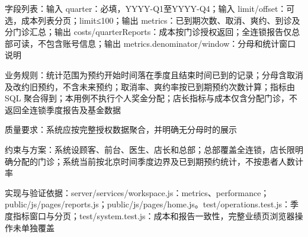 \documentclass[UTF8,12pt,a4paper,fontset=none]{ctexart}
\begin{document}
字段列表：输入 quarter：必填，YYYY-Q1至YYYY-Q4；输入 limit/\allowbreak{}offset：可选，成本列表分页；limit≤100；输出 metrics：已到期次数、取消、爽约、到诊及分门诊汇总；输出 costs/\allowbreak{}quarterReports：成本按门诊授权返回；全连锁报告仅总部可读，不包含账号信息；输出 metrics.\allowbreak{}denominator/\allowbreak{}window：分母和统计窗口说明\par
业务规则：统计范围为预约开始时间落在季度且结束时间已到的记录；分母含取消及改约旧预约，不含未来预约；取消率、爽约率按已到期预约次数计算；指标由 SQL 聚合得到；本用例不执行个人奖金分配；店长指标与成本仅含分配门诊，不返回全连锁季度报告及基金数据\par
质量要求：系统应按完整授权数据聚合，并明确无分母时的展示\par
约束与方案：系统设顾客、前台、医生、店长和总部；总部覆盖全连锁，店长限明确分配的门诊；系统当前按北京时间季度边界及已到期预约统计，不按患者人数计率\par
实现与验证依据：server/\allowbreak{}services/\allowbreak{}workspace.\allowbreak{}js：metrics、performance；public/\allowbreak{}js/\allowbreak{}pages/\allowbreak{}reports.\allowbreak{}js；public/\allowbreak{}js/\allowbreak{}pages/\allowbreak{}home.\allowbreak{}js。test/\allowbreak{}operations.\allowbreak{}test.\allowbreak{}js：季度指标窗口与分页；test/\allowbreak{}system.\allowbreak{}test.\allowbreak{}js：成本和报告一致性，完整业绩页浏览器操作未单独覆盖\par
{}
\end{document}
